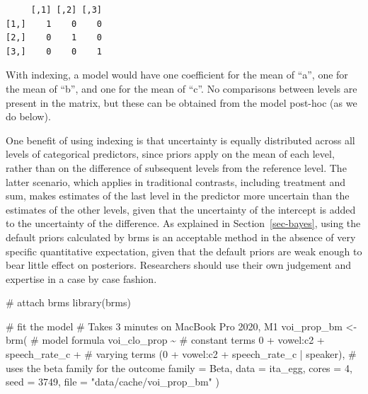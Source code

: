 \documentclass[
  authoryear,
  preprint,
  3p]{elsarticle}
\newenvironment{Shaded}{\begin{snugshade}}{\end{snugshade}}
\newcommand{\AttributeTok}[1]{\textcolor[rgb]{0.40,0.45,0.13}{#1}}
\newcommand{\CommentTok}[1]{\textcolor[rgb]{0.37,0.37,0.37}{#1}}
\newcommand{\DecValTok}[1]{\textcolor[rgb]{0.68,0.00,0.00}{#1}}
\newcommand{\FunctionTok}[1]{\textcolor[rgb]{0.28,0.35,0.67}{#1}}
\newcommand{\NormalTok}[1]{\textcolor[rgb]{0.00,0.23,0.31}{#1}}
\newcommand{\OtherTok}[1]{\textcolor[rgb]{0.00,0.23,0.31}{#1}}
\newcommand{\SpecialCharTok}[1]{\textcolor[rgb]{0.37,0.37,0.37}{#1}}
\newcommand{\StringTok}[1]{\textcolor[rgb]{0.13,0.47,0.30}{#1}}
\begin{document}
\begin{verbatim}
     [,1] [,2] [,3]
[1,]    1    0    0
[2,]    0    1    0
[3,]    0    0    1
\end{verbatim}

\textcolor[HTML]{b22222}{With indexing, a model would have one
coefficient for the mean of ``a'', one for the mean of ``b'', and one
for the mean of ``c''. No comparisons between levels are present in the
matrix, but these can be obtained from the model post-hoc (as we do
below).}

One benefit of using indexing is that uncertainty is equally distributed
across all levels of categorical predictors, since priors apply on the
mean of each level, rather than on the difference of subsequent levels
from the reference level. The latter scenario, which applies in
traditional contrasts, including treatment and sum, makes estimates of
the last level in the predictor more uncertain than the estimates of the
other levels, given that the uncertainty of the intercept is added to
the uncertainty of the difference. As explained in
Section~\ref{sec-bayes}, using the default priors calculated by brms is
an acceptable method in the absence of very specific quantitative
expectation, given that the default priors are weak enough to bear
little effect on posteriors. Researchers should use their own judgement
and expertise in a case by case fashion.

\begin{Shaded}
\begin{Highlighting}[]
\CommentTok{\# attach brms}
\FunctionTok{library}\NormalTok{(brms)}

\CommentTok{\# fit the model}
\CommentTok{\# Takes 3 minutes on MacBook Pro 2020, M1}
\NormalTok{voi\_prop\_bm }\OtherTok{\textless{}{-}} \FunctionTok{brm}\NormalTok{(}
  \CommentTok{\# model formula}
\NormalTok{  voi\_clo\_prop }\SpecialCharTok{\textasciitilde{}}
    \CommentTok{\# constant terms}
    \DecValTok{0} \SpecialCharTok{+}\NormalTok{ vowel}\SpecialCharTok{:}\NormalTok{c2 }\SpecialCharTok{+}\NormalTok{ speech\_rate\_c }\SpecialCharTok{+}
    \CommentTok{\# varying terms}
\NormalTok{    (}\DecValTok{0} \SpecialCharTok{+}\NormalTok{ vowel}\SpecialCharTok{:}\NormalTok{c2 }\SpecialCharTok{+}\NormalTok{ speech\_rate\_c }\SpecialCharTok{|}\NormalTok{ speaker),}
  \CommentTok{\# uses the beta family for the outcome}
  \AttributeTok{family =}\NormalTok{ Beta,}
  \AttributeTok{data =}\NormalTok{ ita\_egg,}
  \AttributeTok{cores =} \DecValTok{4}\NormalTok{,}
  \AttributeTok{seed =} \DecValTok{3749}\NormalTok{,}
  \AttributeTok{file =} \StringTok{"data/cache/voi\_prop\_bm"}
\NormalTok{)}
\end{Highlighting}
\end{Shaded}
\end{document}
